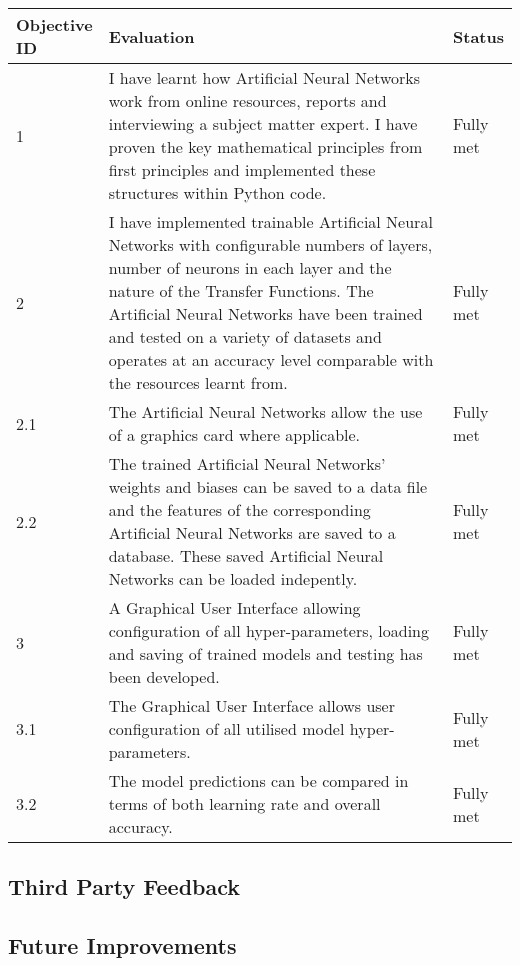 \documentclass[./project-report/src/latex/project-report.tex]{subfiles}
\begin{document}
\begin{tabular}{|p{0.13\linewidth}|p{0.75\linewidth}|p{0.12\linewidth}|}
    \hline
    \textbf{Objective ID} & \textbf{Evaluation} & \textbf{Status} \\
    \hline
    1 & I have learnt how Artificial Neural Networks work from online resources, reports and interviewing a subject matter expert. I have proven the key mathematical principles from first principles 
        and implemented these structures within Python code. & Fully met \\
    \hline
    2 & I have implemented trainable Artificial Neural Networks with configurable numbers of layers, number of neurons in each layer and the nature of the Transfer Functions. The Artificial Neural 
        Networks have been trained and tested on a variety of datasets and operates at an accuracy level comparable with the resources learnt from. & Fully met \\
    \hline
    2.1 & The Artificial Neural Networks allow the use of a graphics card where applicable. & Fully met \\
    \hline
    2.2 & The trained Artificial Neural Networks' weights and biases can be saved to a data file and the features of the corresponding Artificial Neural Networks are saved to a database. These saved 
          Artificial Neural Networks can be loaded indepently. & Fully met \\
    \hline
    3 & A Graphical User Interface allowing configuration of all hyper-parameters, loading and saving of trained models and testing has been developed. & Fully met \\
    \hline
    3.1 & The Graphical User Interface allows user configuration of all utilised model hyper-parameters. & Fully met \\
    \hline
    3.2 & The model predictions can be compared in terms of both learning rate and overall accuracy. & Fully met \\
    \hline
\end{tabular}

\subsection{Third Party Feedback}

\subsection{Future Improvements}
\end{document}
